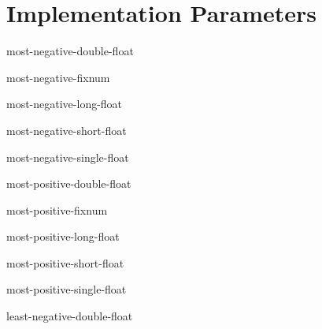 \section{Implementation Parameters}
\label{sec:impl-param}

\begin{constant}{most-negative-double-float}{}{}{}
  
\end{constant}

\begin{constant}{most-negative-fixnum}{}{}{}
  
\end{constant}

\begin{constant}{most-negative-long-float}{}{}{}
  
\end{constant}

\begin{constant}{most-negative-short-float}{}{}{}
  
\end{constant}

\begin{constant}{most-negative-single-float}{}{}{}
  
\end{constant}

\begin{constant}{most-positive-double-float}{}{}{}
  
\end{constant}

\begin{constant}{most-positive-fixnum}{}{}{}
  
\end{constant}

\begin{constant}{most-positive-long-float}{}{}{}
  
\end{constant}

\begin{constant}{most-positive-short-float}{}{}{}
  
\end{constant}

\begin{constant}{most-positive-single-float}{}{}{}
  
\end{constant}

\begin{constant}{least-negative-double-float}{}{}{}
  
\end{constant}

